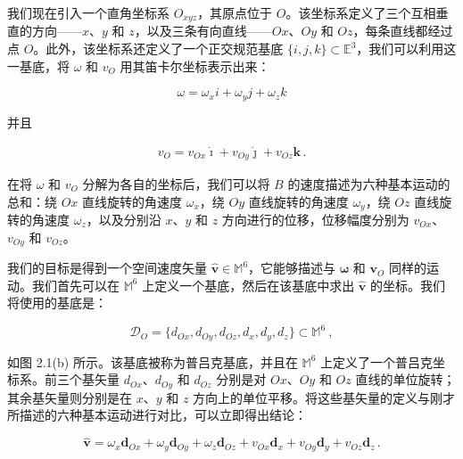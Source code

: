 \documentclass[10pt,a4paper]{book}
\theoremstyle{thmstyle} %
\theoremstyle{defstyle} %
\theoremstyle{prostyle} %
\begin{document}
我们现在引入一个直角坐标系 $O_{xyz}$，其原点位于 $O$。该坐标系定义了三个互相垂直的方向——$x$、$y$ 和 $z$，以及三条有向直线——$Ox$、$Oy$ 和 $Oz$，每条直线都经过点 $O$。此外，该坐标系还定义了一个正交规范基底 $\{i,j,k\} \subset \mathbb{E}^3$，我们可以利用这一基底，将 $\omega$ 和 $v_O$ 用其笛卡尔坐标表示出来：



$$
\omega = \omega _ { x } i + \omega _ { y } j + \omega _ { z } k
$$



并且



$$
\begin{array}{r} { v _ { O } = v _ { O x } \dot { \boldsymbol { \imath } } + v _ { O y } \dot { \boldsymbol { \jmath } } + v _ { O z } \boldsymbol { k } \, . } \end{array}
$$



在将 $\omega$ 和 $v_{O}$ 分解为各自的坐标后，我们可以将 $B$ 的速度描述为六种基本运动的总和：绕 $Ox$ 直线旋转的角速度 $\omega_{x}$，绕 $Oy$ 直线旋转的角速度 $\omega_{y}$，绕 $Oz$ 直线旋转的角速度 $\omega_{z}$，以及分别沿 $x$、$y$ 和 $z$ 方向进行的位移，位移幅度分别为 $v_{Ox}$、$v_{Oy}$ 和 $v_{Oz}$。



我们的目标是得到一个空间速度矢量 $\hat{\boldsymbol{v}} \in \mathbb{M}^{6}$，它能够描述与 $\boldsymbol{\omega}$ 和 $\boldsymbol{v}_{O}$ 同样的运动。我们首先可以在 $\mathbb{M}^{6}$ 上定义一个基底，然后在该基底中求出 $\hat{\boldsymbol{v}}$ 的坐标。我们将使用的基底是：



$$
\mathcal { D } _ { O } = \{ d _ { O x } , d _ { O y } , d _ { O z } , d _ { x } , d _ { y } , d _ { z } \} \subset \mathbb { M } ^{6} \ ,
$$



如图 2.1(b) 所示。该基底被称为普吕克基底，并且在 $\mathbb{M}^6$ 上定义了一个普吕克坐标系。前三个基矢量 $d_{Ox}$、$d_{Oy}$ 和 $d_{Oz}$ 分别是对 $Ox$、$Oy$ 和 $Oz$ 直线的单位旋转；其余基矢量则分别是在 $x$、$y$ 和 $z$ 方向上的单位平移。将这些基矢量的定义与刚才所描述的六种基本运动进行对比，可以立即得出结论：



$$
\hat { \mathbf { v } } = \omega _ { x } \mathbf { d } _ { O x } + \omega _ { y } \mathbf { d } _ { O y } + \omega _ { z } \mathbf { d } _ { O z } + v _ { O x } \mathbf { d } _ { x } + v _ { O y } \mathbf { d } _ { y } + v _ { O z } \mathbf { d } _ { z } \, .
$$
\end{document}
